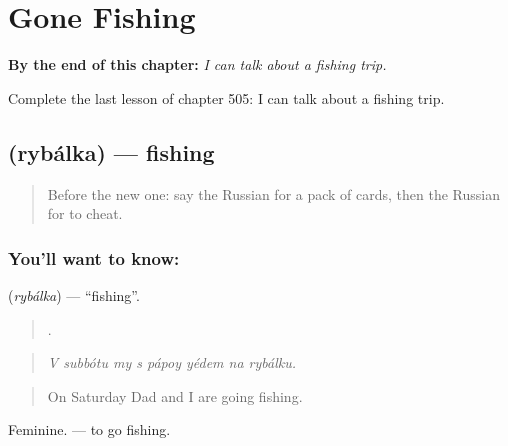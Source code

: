 
\chapter{Gone Fishing}
\label{ch:ru-gone-fishing}

\begin{chapteropening}
\textbf{By the end of this chapter:} \emph{I can talk about a fishing trip.}

Complete the last lesson of chapter 505: I can talk about a fishing trip.
\end{chapteropening}

\section[\texorpdfstring{\ru{рыбалка} (rybálka)}{рыбалка (rybálka)}]{ (rybálka) — fishing}

\label{lesson:RU-C505-rybalka}



\begin{quote}
Before the new one: say the Russian for a pack of cards, then the Russian for to cheat.
\end{quote}

\subsection*{You'll want to know: }
\textbf{} (\emph{rybálka}) — \textquotedblleft{}fishing\textquotedblright{}.

\begin{quote}
       .
\end{quote}

\begin{quote}
\emph{V subbótu my s pápoy yédem na rybálku.}
\end{quote}

\begin{quote}
On Saturday Dad and I are going fishing.
\end{quote}

Feminine. \emph{  } — to go fishing.

